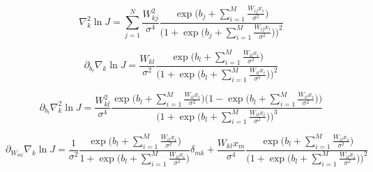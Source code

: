 \begin{equation*}
\nabla_k^2 \ln J=\sum_{j=1}^N\frac{W_{kj}^2}{\sigma^4}\frac{\exp\big(b_j+\sum_{i=1}^M\frac{W_{ij}x_i}{\sigma^2}\big)}{\Big(1+\exp\big(b_j+\sum_{i=1}^M\frac{W_{ij}x_i}{\sigma^2}\big)\Big)^2}
\end{equation*}

\begin{equation*}
\partial_{b_l}\nabla_k \ln J=\frac{W_{kl}}{\sigma^2}\frac{\exp\big(b_l+\sum_{i=1}^M\frac{W_{il}x_i}{\sigma^2}\big)}{\Big(1+\exp\big(b_l+\sum_{i=1}^M\frac{W_{il}x_i}{\sigma^2}\big)\Big)^2}
\end{equation*}

\begin{equation*}
\partial_{b_l}\nabla_k^2 \ln J=\frac{W_{kl}^2}{\sigma^4}\frac{\exp\big(b_l+\sum_{i=1}^M\frac{W_{il}x_i}{\sigma^2}\big)\Big(1-\exp\big(b_l+\sum_{i=1}^M\frac{W_{il}x_i}{\sigma^2}\big)\Big)}{\Big(1+\exp\big(b_l+\sum_{i=1}^M\frac{W_{il}x_i}{\sigma^2}\big)\Big)^3}
\end{equation*}

\begin{equation*}
\partial_{W_{ml}}\nabla_k \ln J=\frac{1}{\sigma^2}\frac{\exp\big(b_l+\sum_{i=1}^M\frac{W_{il}x_i}{\sigma^2}\big)}{1+\exp\big(b_l+\sum_{i=1}^M\frac{W_{il}x_i}{\sigma^2}\big)}\delta_{mk}
+\frac{W_{kl}x_m}{\sigma^4}\frac{\exp\big(b_l+\sum_{i=1}^M\frac{W_{il}x_i}{\sigma^2}\big)}{\Big(1+\exp\big(b_l+\sum_{i=1}^M\frac{W_{il}x_i}{\sigma^2}\big)\Big)^2}
\end{equation*}

